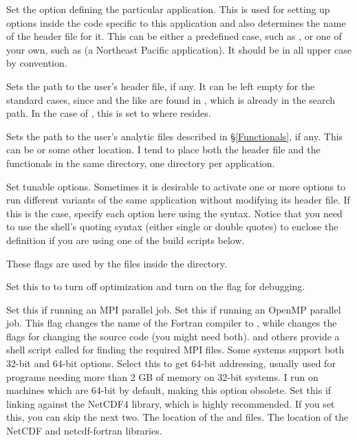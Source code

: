 \begin{klist}

 Set the  option defining the particular
application. This is used for setting up options inside the code
specific to this application and also determines the name of the
 header file for it. This can be either a predefined
case, such as , or one of your own, such as 
(a Northeast Pacific application).
It should be in all upper case by convention.

 Sets the path to the user's header file, if
any. It can be left empty for the standard cases, since 
and the like are found in , which is already in
the search path. In the case of , this is set to
 where  resides.

 Sets the path to the user's analytic files
described in \S\ref{Functionals}, if any. This can be 
or some other location. I tend to place both the header file and the
functionals in the same directory, one directory per application.

 Set tunable  options. Sometimes it is desirable
to activate one or more  options to run different variants of the
same application without modifying its header file. If this is the
case, specify each option here using the  syntax. Notice that
you need to use the shell's quoting syntax (either single or double
quotes) to enclose the definition if you are using one of the build
scripts below.


 These flags are used by the files
inside the  directory.
\begin{klist}
   Set this to  to turn off optimization
and turn on the  flag for debugging.

   Set this if running an MPI parallel job.
   Set this if running an OpenMP parallel job.
   This flag changes the name of the
  Fortran compiler to , while
   changes the  flags
  for changing the source code (you might need both).  and others
  provide a shell script called  for finding the required MPI
  files.
    Some systems support both 32-bit and 64-bit
  options. Select this to get 64-bit addressing, usually used for
  programs needing more than 2 GB of memory on 32-bit systems.
  I run on machines which are 64-bit by default, making this option
  obsolete.
   Set this if linking against the NetCDF4
  library, which is highly
  recommended. If you set this, you can skip the next two.
   The location of the  and
   files.
   The location of the NetCDF and netcdf-fortran
  libraries.
\end{klist}


\end{klist}
